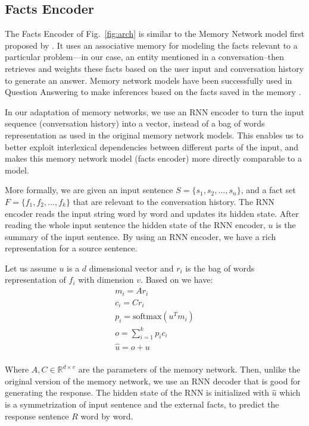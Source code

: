 \documentclass[letterpaper]{article}
\begin{document}
\subsection{Facts Encoder}

The Facts Encoder of Fig.~\ref{fig:arch} is similar to the Memory Network model first proposed by \cite{weston2014,sukhbaatar2015}.
It uses an associative memory for modeling the facts
relevant to a particular problem---in our case, an entity mentioned in a conversation--then retrieves and weights these facts based on the user input and conversation history to generate an answer.
Memory network models
have been successfully used
in Question Answering to make inferences based on the facts saved in the memory \cite{weston2015}.

In our adaptation of memory networks, we use an RNN encoder to turn the input sequence (conversation history) into a vector, instead of a bag of words representation as used in the original memory network models.
This enables us to better exploit interlexical dependencies between different parts of the input, and makes this memory network model (facts encoder) more directly comparable to a \sts model.

More formally, we are given an input sentence $S=\{s_{1}, s_{2}, ..., s_{n}\}$, and a fact set $F=\{f_1,f_2,...,f_k\}$ that are relevant to the conversation history.
The RNN encoder reads the input string word by word and updates its hidden state.
After reading the whole input sentence the hidden state of the RNN encoder, $u$ is the summary of the input sentence.
By using an RNN encoder, we have a rich representation for a source sentence.

Let us assume $u$ is a $d$ dimensional vector and $r_i$ is the bag of words representation of $f_i$ with dimension $v$. Based on \cite{sukhbaatar2015} we have:
\begin{align}
m_i=A r_i\\
c_i=C r_i\\
p_i=\textrm{softmax}(u^T m_i)\\
o=\sum _{i=1}^{k} p_i c_i\\
\hat u = o+u \label{eq:sum}
\end{align}\\[-0.5cm]
Where $A,C \in \mathbb{R}^{d\times v}$ are the parameters of the memory network. Then, unlike the original version of the memory network, we use an RNN decoder that is good for generating the response. The hidden state of the RNN is initialized with $\hat u$ which is a symmetrization of input sentence and the external facts, to predict the response sentence $R$ word by word.
\end{document}
